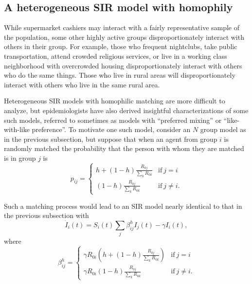 \documentclass[11pt]{article}
\begin{document}
\subsection{A heterogeneous SIR model with homophily}

While supermarket cashiers may interact with a fairly representative sample of the population, some other highly active groups 
disproportionately interact with others in their group. For example, those who frequent nightclubs, take public 
transportation, attend crowded religious services, or live in a working class neighborhood with overcrowded housing
disproportionately interact with others who do the same things. Those who live in rural areas will disproportionately interact with others who live in the same rural area.

Heterogeneous SIR models with homophilic matching are more difficult to analyze, but epidemiologists have also derived insightful
characterizations of some such models, referred to sometimes as models with ``preferred mixing'' or ``like-with-like preference''.
To motivate one such model, consider an $N$ group model as in the previous subsection, but suppose that when an agent from
group $i$ is randomly matched the probability that the person with whom they are matched is in group $j$ is
$$
p_{ij} = \left\{ \begin{array}{ll} h + (1-h) \frac{R_{0j}}{\sum_{k} R_{0k}} & \mbox{if} \ j=i \\
                                                      (1-h) \frac{R_{0j}}{\sum_{k} R_{0k}} & \mbox{if} \ j \neq i.
\end{array} \right.
$$

Such a matching process would lead to an SIR model nearly identical to that in the previous subsection with
$$
\dot{I}_i(t)  = S_i(t) \sum_j \beta^h_{ij} I_j(t) - \gamma I_i(t), 
$$
where
$$
\beta^h_{ij} = \left\{ \begin{array}{ll}  \gamma R_{0i} ( h + (1-h) \frac{R_{0j}}{\sum_{k} R_{0k}} ) & \mbox{if} \ j=i \\
                                                            \gamma R_{0i} (1-h) \frac{R_{0j}}{\sum_{k} R_{0k}} & \mbox{if} \ j \neq i.
\end{array} \right.
$$
\end{document}
